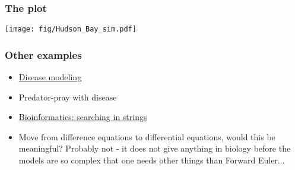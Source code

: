 \documentclass{beamer}
\begin{document}
\begin{frame}
\frametitle{The plot}

\centerline{\texttt{[image: fig/Hudson\_Bay\_sim.pdf]}}
\end{frame}

\begin{frame}
\frametitle{Other examples}

\begin{block}{}
\begin{itemize}
 \item \href{{http://hplgit.github.io/disease-modeling/doc/web/index.html}}{Disease modeling}

 \item Predator-pray with disease

 \item \href{{http://hplgit.github.io/bioinf-py/doc/web/index.html}}{Bioinformatics: searching in strings}

 \item Move from difference equations to differential equations, would this be meaningful? Probably not - it does not give anything in biology before the models are so complex that one needs other things than Forward Euler...
\end{itemize}

\noindent
\end{block}
\end{frame}
\end{document}
